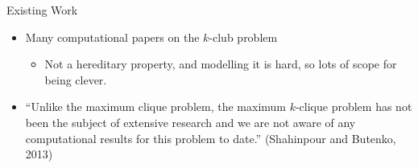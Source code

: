 \documentclass{beamer}
\begin{document}
\begin{frame}{Existing Work}
    \begin{itemize}
        \item Many computational papers on the $k$-club problem
            \begin{itemize}
                \item Not a hereditary property, and modelling it is hard, so lots of scope for
                    being clever.
            \end{itemize}

        \item ``Unlike the maximum clique problem, the maximum $k$-clique problem has not been the
            subject of extensive research and we are not aware of any computational results for this
            problem to date.'' (Shahinpour and Butenko, 2013)
    \end{itemize}
\end{frame}
\end{document}
